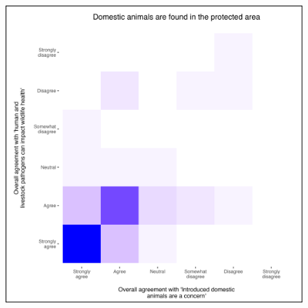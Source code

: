 \documentclass[
  letterpaper,
  DIV=11,
  numbers=noendperiod]{scrartcl}
\begin{document}
\begin{figure}[H]

{\centering \includegraphics[width=5.20833in,height=\textheight]{plots/appedix_plot_6.png}

}

\end{figure}
\end{document}
